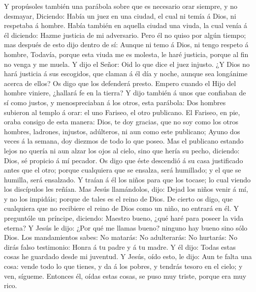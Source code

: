  Y propúsoles también una parábola sobre que es necesario
orar siempre, y no desmayar,  Diciendo: Había un juez en una
ciudad, el cual ni temía á Dios, ni respetaba á hombre. 
Había también en aquella ciudad una viuda, la cual venía á él diciendo:
Hazme justicia de mi adversario.  Pero él no quiso por algún
tiempo; mas después de esto dijo dentro de sí: Aunque ni temo á Dios, ni
tengo respeto á hombre,  Todavía, porque esta viuda me es
molesta, le haré justicia, porque al fin no venga y me muela.
 Y dijo el Señor: Oid lo que dice el juez injusto.
 ¿Y Dios no hará justicia á sus escogidos, que claman á él
día y noche, aunque sea longánime acerca de ellos?  Os digo
que los defenderá presto. Empero cuando el Hijo del hombre viniere,
¿hallará fe en la tierra?  Y dijo también á unos que
confiaban de sí como justos, y menospreciaban á los otros, esta
parábola:  Dos hombres subieron al templo á orar: el uno
Fariseo, el otro publicano.  El Fariseo, en pie, oraba
consigo de esta manera: Dios, te doy gracias, que no soy como los otros
hombres, ladrones, injustos, adúlteros, ni aun como este publicano;
 Ayuno dos veces á la semana, doy diezmos de todo lo que
poseo.  Mas el publicano estando lejos no quería ni aun
alzar los ojos al cielo, sino que hería su pecho, diciendo: Dios, sé
propicio á mí pecador.  Os digo que éste descendió á su
casa justificado antes que el otro; porque cualquiera que se ensalza,
será humillado; y el que se humilla, será ensalzado.  Y
traían á él los niños para que los tocase; lo cual viendo los discípulos
les reñían.  Mas Jesús llamándolos, dijo: Dejad los niños
venir á mí, y no los impidáis; porque de tales es el reino de Dios.
 De cierto os digo, que cualquiera que no recibiere el
reino de Dios como un niño, no entrará en él.  Y preguntóle
un príncipe, diciendo: Maestro bueno, ¿qué haré para poseer la vida
eterna?  Y Jesús le dijo: ¿Por qué me llamas bueno? ninguno
hay bueno sino sólo Dios.  Los mandamientos sabes: No
matarás: No adulterarás: No hurtarás: No dirás falso testimonio: Honra á
tu padre y á tu madre.  Y él dijo: Todas estas cosas he
guardado desde mi juventud.  Y Jesús, oído esto, le dijo:
Aun te falta una cosa: vende todo lo que tienes, y da á los pobres, y
tendrás tesoro en el cielo; y ven, sígueme.  Entonces él,
oídas estas cosas, se puso muy triste, porque era muy rico.
